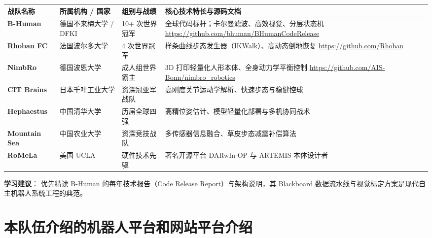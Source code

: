 \documentclass[11pt,a4paper]{ctexart}
\begin{document}
\begin{table}[h]
\centering
\small
\begin{tabularx}{\textwidth}{l p{3.2cm} p{2.2cm} X}
\toprule
\textbf{战队名称} & \textbf{所属机构 / 国家} & \textbf{组别与战绩} & \textbf{核心技术特长与源码文档} \\
\midrule
\textbf{B-Human} & 德国不来梅大学 / DFKI & 10+ 次世界冠军 & 全球代码标杆；卡尔曼滤波、高效视觉、分层状态机 \newline \url{https://github.com/bhuman/BHumanCodeRelease} \\
\addlinespace
\textbf{Rhoban FC} & 法国波尔多大学 & 4 次世界冠军 & 样条曲线步态发生器（IKWalk）、高动态倒地恢复 \newline \url{https://github.com/Rhoban} \\
\addlinespace
\textbf{NimbRo} & 德国波恩大学 & 成人组世界霸主 & 3D 打印轻量化人形本体、全身动力学平衡控制 \newline \url{https://github.com/AIS-Bonn/nimbro_robotics} \\
\addlinespace
\textbf{CIT Brains} & 日本千叶工业大学 & 资深冠亚军战队 & 高刚度关节运动学解析、快速步态与稳健控球 \\
\addlinespace
\textbf{Hephaestus} & 中国清华大学 & 历届全球四强 & 高精位姿估计、模型轻量化部署与多机协同战术 \\
\addlinespace
\textbf{Mountain Sea} & 中国农业大学 & 资深竞技战队 & 多传感器信息融合、草皮步态减震补偿算法 \\
\addlinespace
\textbf{RoMeLa} & 美国 UCLA & 硬件技术先驱 & 著名开源平台 DARwIn-OP 与 ARTEMIS 本体设计者 \\
\bottomrule
\end{tabularx}
\end{table}

\textbf{学习建议}：
优先精读 B-Human 的每年技术报告（Code Release Report）与架构说明，其 Blackboard 数据流水线与视觉标定方案是现代自主机器人系统工程的典范。

\newpage
\section{本队伍介绍的机器人平台和网站平台介绍}
\end{document}
